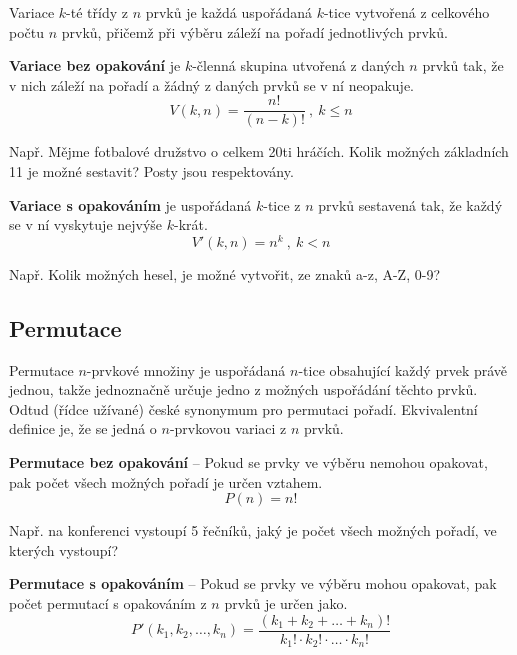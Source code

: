 \begin{compactitem}
    \item Variace $k$-té třídy z $n$ prvků je každá uspořádaná $k$-tice vytvořená z celkového počtu $n$ prvků, přičemž při výběru záleží na pořadí jednotlivých prvků.

    \item \textbf{Variace bez opakování} je $k$-členná skupina utvořená z daných $n$ prvků tak, že v nich záleží na pořadí a žádný z daných prvků se v ní neopakuje.
    $$ V(k, n) = \frac{n!}{(n-k)!} ~,~ k \leq n $$ \begin{compactitem}
        \item Např. Mějme fotbalové družstvo o celkem 20ti hráčích. Kolik možných základních 11 je možné sestavit? Posty jsou respektovány.
    \end{compactitem}

    \item \textbf{Variace s opakováním} je uspořádaná $k$-tice z $n$ prvků sestavená tak, že každý se v ní vyskytuje nejvýše $k$-krát.
    $$ V'(k, n) = n^k ~,~ k < n $$ \begin{compactitem}
        \item Např. Kolik možných hesel, je možné vytvořit, ze znaků a-z, A-Z, 0-9?
    \end{compactitem}
\end{compactitem}

\subsection{Permutace}

\begin{compactitem}
    \item Permutace $n$-prvkové množiny je uspořádaná $n$-tice obsahující každý prvek právě jednou, takže jednoznačně určuje jedno z možných uspořádání těchto prvků. Odtud (řídce užívané) české synonymum pro permutaci pořadí. Ekvivalentní definice je, že se jedná o $n$-prvkovou variaci z $n$ prvků.

    \item \textbf{Permutace bez opakování} -- Pokud se prvky ve výběru nemohou opakovat, pak počet všech možných pořadí je určen vztahem.
    $$ P(n) = n! $$ \begin{compactitem}
        \item Např. na konferenci vystoupí 5 řečníků, jaký je počet všech možných pořadí, ve kterých vystoupí?
    \end{compactitem}

    \item \textbf{Permutace s opakováním} -- Pokud se prvky ve výběru mohou opakovat, pak počet permutací s opakováním z $n$ prvků je určen jako.
    $$ P'{(k_1,k_2,\ldots,k_n)} = \frac {(k_1+k_2+\ldots+k_n)!}{{k_1!}\cdot{k_2!}\cdot\ldots\cdot{k_n!}} $$
\end{compactitem}

